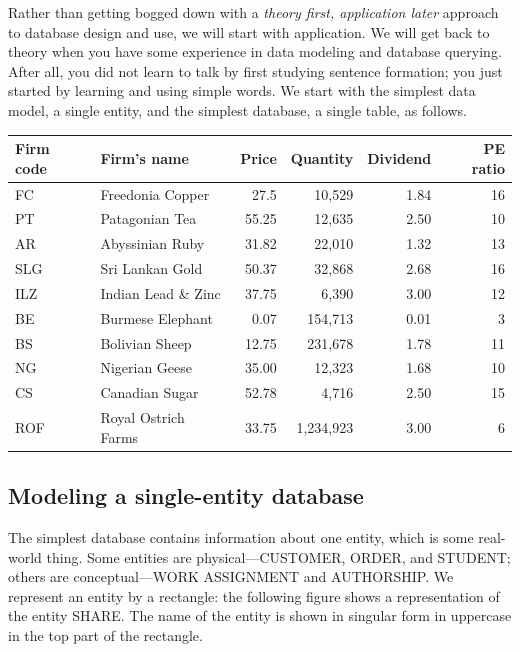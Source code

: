 \documentclass[
]{article}
\begin{document}
Rather than getting bogged down with a \emph{theory first, application later} approach to database design and use, we will start with application. We will get back to theory when you have some experience in data modeling and database querying. After all, you did not learn to talk by first studying sentence formation; you just started by learning and using simple words. We start with the simplest data model, a single entity, and the simplest database, a single table, as follows.

\begin{longtable}[]{@{}llrrrr@{}}
\toprule
Firm code & Firm's name & Price & Quantity & Dividend & PE ratio \\
\midrule
\endhead
FC & Freedonia Copper & 27.5 & 10,529 & 1.84 & 16 \\
PT & Patagonian Tea & 55.25 & 12,635 & 2.50 & 10 \\
AR & Abyssinian Ruby & 31.82 & 22,010 & 1.32 & 13 \\
SLG & Sri Lankan Gold & 50.37 & 32,868 & 2.68 & 16 \\
ILZ & Indian Lead \& Zinc & 37.75 & 6,390 & 3.00 & 12 \\
BE & Burmese Elephant & 0.07 & 154,713 & 0.01 & 3 \\
BS & Bolivian Sheep & 12.75 & 231,678 & 1.78 & 11 \\
NG & Nigerian Geese & 35.00 & 12,323 & 1.68 & 10 \\
CS & Canadian Sugar & 52.78 & 4,716 & 2.50 & 15 \\
ROF & Royal Ostrich Farms & 33.75 & 1,234,923 & 3.00 & 6 \\
\bottomrule
\end{longtable}

\hypertarget{modeling-a-single-entity-database}{%
\subsection*{Modeling a single-entity database}\label{modeling-a-single-entity-database}}

The simplest database contains information about one entity, which is some real-world thing. Some entities are physical---CUSTOMER, ORDER, and STUDENT; others are conceptual---WORK ASSIGNMENT and AUTHORSHIP. We represent an entity by a rectangle: the following figure shows a representation of the entity SHARE. The name of the entity is shown in singular form in uppercase in the top part of the rectangle.
\end{document}
